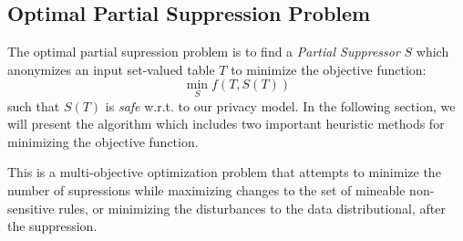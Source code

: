 \subsection{Optimal Partial Suppression Problem}
The optimal partial supression problem is to find a {\em Partial Suppressor} $S$ which anonymizes an input set-valued table $T$ to minimize the objective function:
\[\min_S f(T, S(T))\]
such that $S(T)$ is {\em safe} w.r.t. to our privacy model.
In the following section, we will present the algorithm which 
includes two important heuristic 
methods for minimizing the objective function.

This is a multi-objective optimization problem 
that attempts to minimize the
number of supressions while maximizing changes to the set 
of mineable non-sensitive rules, or 
minimizing the disturbances to the data distributional, after the suppression.


